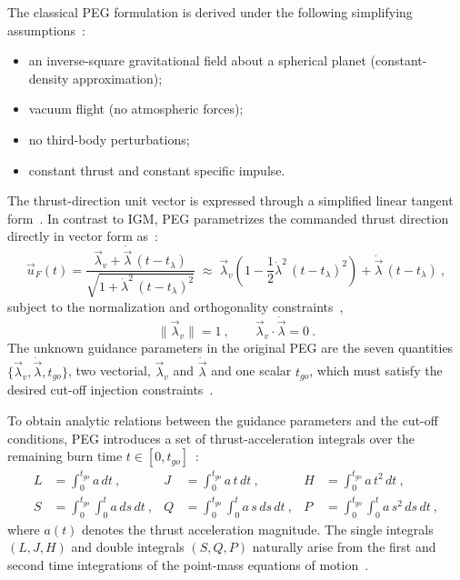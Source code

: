 The classical PEG formulation is derived under the following simplifying assumptions~\cite{mchenry1979shuttle_ascent_gnc}:
\begin{itemize}
  \item an inverse-square gravitational field about a spherical planet (constant-density approximation);
  \item vacuum flight (no atmospheric forces);
  \item no third-body perturbations;
  \item constant thrust and constant specific impulse.
\end{itemize}

The thrust-direction unit vector is expressed through a simplified linear tangent form~\cite{mchenry1979shuttle_ascent_gnc}. In contrast to IGM, PEG parametrizes the commanded thrust direction directly in vector form as~\cite{SONG2015463}:
\begin{equation}
\vec u_F(t)=
\frac{\vec\lambda_v+\dot{\vec\lambda}\,(t-t_\lambda)}
{\sqrt{1+\dot{\lambda}^2\,(t-t_\lambda)^2}}
\;\approx\;
\vec\lambda_v\!\left(1-\frac{1}{2}\dot{\lambda}^2\,(t-t_\lambda)^2\right)
+\dot{\vec\lambda}\,(t-t_\lambda) \ ,
\label{eq:peg_uF}
\end{equation}
subject to the normalization and orthogonality constraints~\cite{SONG2015463},
\begin{equation}
\|\vec\lambda_v\|=1 \ ,
\qquad
\vec\lambda_v\cdot\dot{\vec\lambda}=0 \ .
\label{eq:peg_constraints}
\end{equation}
The unknown guidance parameters in the original PEG are the seven quantities
$\{\vec\lambda_v,\dot{\vec\lambda},t_{go}\}$, two vectorial, $\vec\lambda_v$ and $\dot{\vec\lambda}$ and one scalar $t_{go}$, which must satisfy the desired cut-off injection constraints~\cite{SONG2015463}.

To obtain analytic relations between the guidance parameters and the cut-off conditions, PEG introduces a set of thrust-acceleration integrals over the remaining burn time $t\in[0,t_{go}]$~\cite{SONG2015463}:
\begin{align}
L &= \int_{0}^{t_{go}} a\,dt \ ,
&
J &= \int_{0}^{t_{go}} a\,t\,dt \ ,
&
H &= \int_{0}^{t_{go}} a\,t^{2}\,dt \ ,
\label{eq:peg_LJH}
\\[2pt]
S &= \int_{0}^{t_{go}} \int_{0}^{t} a\,ds\,dt \ ,
&
Q &= \int_{0}^{t_{go}} \int_{0}^{t} a\,s\,ds\,dt \ ,
&
P &= \int_{0}^{t_{go}} \int_{0}^{t} a\,s^{2}\,ds\,dt \ ,
\label{eq:peg_SQP}
\end{align}
where $a(t)$ denotes the thrust acceleration magnitude. The single integrals $(L,J,H)$ and double integrals $(S,Q,P)$ naturally arise from the first and second time integrations of the point-mass equations of motion~\cite{SONG2015463}.

